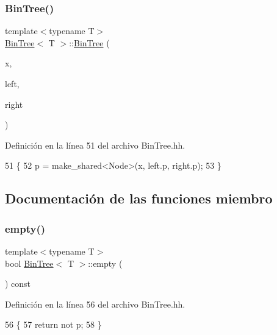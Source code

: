 \subsubsection{\texorpdfstring{Bin\+Tree()}{BinTree()}\hspace{0.1cm}{\footnotesize\ttfamily [3/3]}}
{\footnotesize\ttfamily template$<$typename T$>$ \\
\hyperlink{class_bin_tree}{Bin\+Tree}$<$ T $>$\+::\hyperlink{class_bin_tree}{Bin\+Tree} (\begin{DoxyParamCaption}\item[{const T \&}]{x,  }\item[{const \hyperlink{class_bin_tree}{Bin\+Tree}$<$ T $>$ \&}]{left,  }\item[{const \hyperlink{class_bin_tree}{Bin\+Tree}$<$ T $>$ \&}]{right }\end{DoxyParamCaption})}



Definición en la línea 51 del archivo Bin\+Tree.\+hh.


\begin{DoxyCode}
51                                                                     \{
52         p = make\_shared<Node>(x, left.p, right.p);
53     \}
\end{DoxyCode}


\subsection{Documentación de las funciones miembro}
\mbox{\label{class_bin_tree_a74cda259ba5c25b8ee38ed4dc33e4fad}} 
\subsubsection{\texorpdfstring{empty()}{empty()}}
{\footnotesize\ttfamily template$<$typename T$>$ \\
bool \hyperlink{class_bin_tree}{Bin\+Tree}$<$ T $>$\+::empty (\begin{DoxyParamCaption}{ }\end{DoxyParamCaption}) const}



Definición en la línea 56 del archivo Bin\+Tree.\+hh.


\begin{DoxyCode}
56                         \{
57         \textcolor{keywordflow}{return} not p;
58     \}
\end{DoxyCode}
\mbox{\label{class_bin_tree_a82108db4c1b08d1f111027788c196d4e}} 
